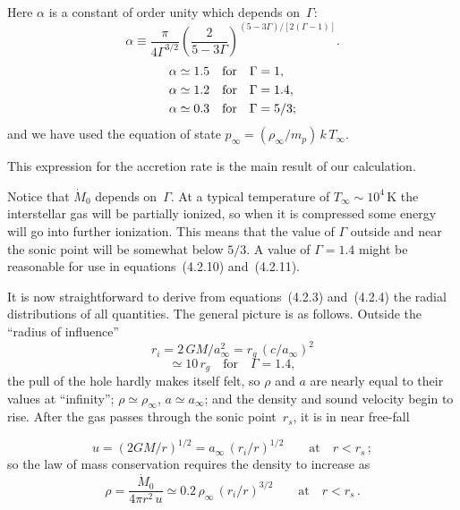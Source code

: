 Here $\alpha$ is a constant of order unity which depends on~$\Gamma$:
\begin{equation}
\alpha \equiv \frac{\pi}{4\Gamma^{3/2}}
  \left(\frac{2}{5-3\Gamma}\right)^{(5-3\Gamma)/[2(\Gamma-1)]}\!.
\tag{4.2.11}
\end{equation}
%
\begin{align}
\alpha &\simeq 1.5  \quad \text{for} \quad \Gamma = 1,    \notag \\
\alpha &\simeq 1.2  \quad \text{for} \quad \Gamma = 1.4,  \notag \\
\alpha &\simeq 0.3  \quad \text{for} \quad \Gamma = 5/3;
\end{align}
%
and we have used the equation of state
$p_\infty = (\rho_\infty / m_p)\,k\,T_\infty$.

This expression for the accretion rate is the main result of our calculation.

Notice that $\dot{M}_0$ depends on~$\Gamma$.  At a typical temperature of
$T_\infty \sim 10^4$\,K the interstellar gas will be partially ionized, so
when it is compressed some energy will go into further ionization.  This means
that the value of $\Gamma$ outside and near the sonic point will be somewhat
below $5/3$.  A value of $\Gamma = 1.4$ might be reasonable for use in
equations~(4.2.10) and~(4.2.11).

It is now straightforward to derive from equations~(4.2.3) and~(4.2.4) the
radial distributions of all quantities.  The general picture is as follows.
Outside the ``radius of influence''
\begin{equation}
r_i = 2\,GM/a_\infty^2 = r_g\,(c/a_\infty)^2
\tag{4.2.12}
\end{equation}
%
\[
\simeq 10\,r_g \quad \text{for} \quad \Gamma = 1.4,
\]
%
the pull of the hole hardly makes itself felt, so $\rho$ and $a$ are nearly
equal to their values at ``infinity''; $\rho \simeq \rho_\infty$,
$a \simeq a_\infty$; and the density and sound velocity begin to rise.
After the gas passes through the sonic point~$r_s$, it is in near free-fall

\begin{equation}
u = (2GM/r)^{1/2} = a_\infty\,(r_i/r)^{1/2}
\qquad \text{at} \quad r < r_s\,;
\tag{4.2.13a}
\end{equation}
%
so the law of mass conservation requires the density to increase as
\begin{equation}
\rho = \frac{\dot{M}_0}{4\pi r^2\,u}
\simeq 0.2\,\rho_\infty\,(r_i/r)^{3/2}
\qquad \text{at} \quad r < r_s\,.
\tag{4.2.13b}
\end{equation}


